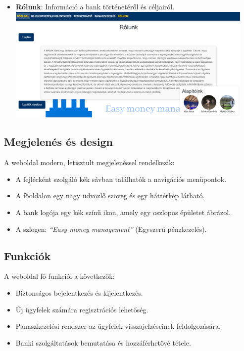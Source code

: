 \documentclass[colorlinks]{thesis-kando}
\theoremstyle{definition}
\theoremstyle{remark}
\begin{document}
\begin{itemize}
\begin{itemize}
    \item \textbf{Rólunk}: Információ a bank történetéről és céljairól.
    \\
    \includegraphics[width=12cm]{figures/rolunkfrontend.png}
    
\end{itemize}

\subsection{Megjelenés és design}
A weboldal modern, letisztult megjelenéssel rendelkezik:
\begin{itemize}
    \item A fejlécként szolgáló kék sávban találhatók a navigációs menüpontok.
    \item A főoldalon egy nagy üdvözlő szöveg és egy háttérkép látható.
    \item A bank logója egy kék színű ikon, amely egy oszlopos épületet ábrázol.
    \item A szlogen: \textit{``Easy money management''} (Egyszerű pénzkezelés).
\end{itemize}

\subsection{Funkciók}
A weboldal fő funkciói a következők:
\begin{itemize}
    \item Biztonságos bejelentkezés és kijelentkezés.
    \item Új ügyfelek számára regisztrációs lehetőség.
    \item Panaszkezelési rendszer az ügyfelek visszajelzéseinek feldolgozására.
    \item Banki szolgáltatások bemutatása és hozzáférhetővé tétele.
\end{itemize}
\newpage

\end{itemize}
\end{document}

